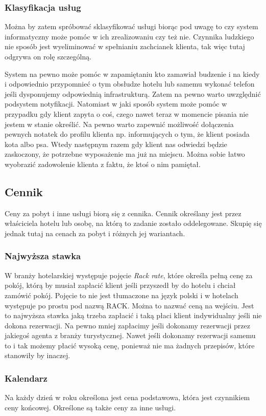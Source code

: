 \documentclass[a4paper,onecolumn,oneside,11pt,wide,floatssmall]{mwrep}
\theoremstyle{definition}
\theoremstyle{plain}%
\theoremstyle{remark}
\begin{document}
\subsubsection{Klasyfikacja usług}
Można by zatem spróbować sklasyfikować usługi biorąc pod uwagę to czy system
informatyczny może pomóc w ich zrealizowaniu czy też nie. Czynnika ludzkiego
nie sposób jest wyeliminować w spełnianiu zachcianek klienta, tak więc tutaj
odgrywa on rolę szczególną.

System na pewno może pomóc w zapamiętaniu kto zamawiał budzenie i na kiedy i
odpowiednio przypomnieć o tym obsłudze hotelu lub samemu wykonać telefon jeśli
dysponujemy odpowiednią infrastrukturą. Zatem na pewno warto uwzględnić
podsystem notyfikacji. Natomiast w jaki sposób system może pomóc w przypadku gdy
klient zapyta o coś, czego nawet teraz w momencie pisania nie jestem w stanie
określić. Na pewno warto zapewnić możliwość dołączenia pewnych notatek do
profilu klienta np. informujących o tym, że klient posiada kota albo psa. Wtedy
następnym razem gdy klient nas odwiedzi będzie zaskoczony, że potrzebne
wyposażenie ma już na miejscu. Można sobie łatwo wyobrazić zadowolenie klienta z
faktu, że ktoś o nim pamiętał. 

\subsection{Cennik}
Ceny za pobyt i inne usługi biorą się z cennika. Cennik określany jest przez
właściciela hotelu lub osobę, na którą to zadanie zostało oddelegowane. Skupię
się jednak tutaj na cenach za pobyt i różnych jej wariantach.

\subsubsection{Najwyższa stawka}
W branży hotelarskiej występuje pojęcie \emph{Rack rate}, które określa pełną
cenę za pokój, którą by musiał zapłacić klient jeśli przyszedł by do hotelu i
chciał zamówić pokój.
Pojęcie to nie jest tłumaczone na język polski i w hotelach występuje po prostu
pod nazwą RACK. Można to nazwać ceną na wejściu. Jest to najwyższa stawka jaką
trzeba zapłacić i taką płaci klient indywidualny jeśli nie dokona rezerwacji. Na
pewno mniej zapłacimy jeśli dokonamy rezerwacji przez jakiegoś agenta z branży turystycznej.
Nawet jeśli dokonamy rezerwacji samemu to i tak możemy płacić wysoką cenę,
ponieważ nie ma żadnych przepisów, które stanowiły by inaczej.

\subsubsection{Kalendarz}
Na każdy dzień w roku określona jest cena podstawowa, która jest czynnikiem ceny
końcowej. Określone są także ceny za inne usługi.
\end{document}
